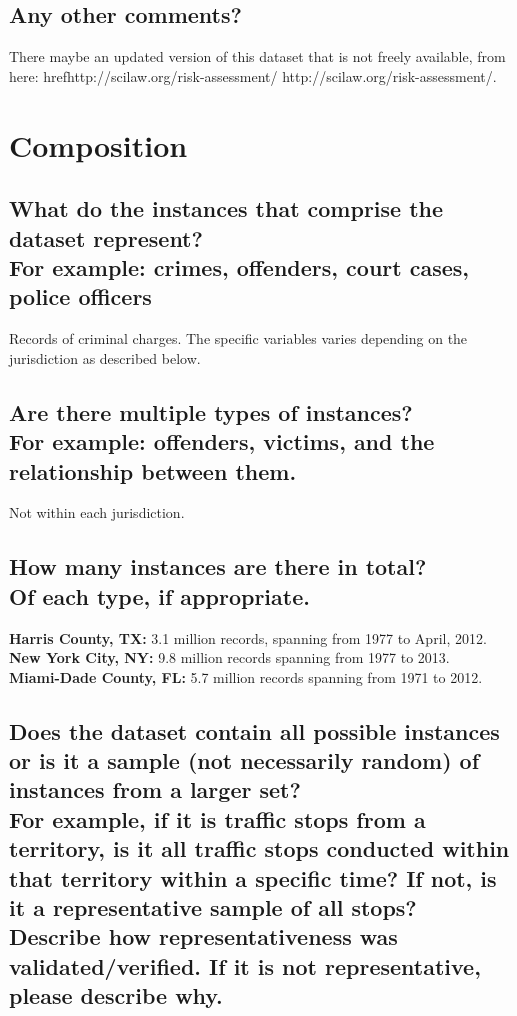 \documentclass[letterpaper, 10 pt, conference]{ieeeconf}  %
\newcommand{\subtitle}[1]{{\\ \small \normalfont \color{purple} #1}}
\begin{document}
\subsection{Any other comments?}

There maybe an updated version of this dataset that is not freely available, from here:
href{http://scilaw.org/risk-assessment/
}{http://scilaw.org/risk-assessment/}.

\section{Composition}

\subsection{What do the instances that comprise the dataset represent? \subtitle{For example: crimes, offenders, court cases, police officers}}

Records of criminal charges. The specific variables varies depending on the jurisdiction as described below.

\subsection{Are there multiple types of instances? \subtitle{For example: offenders, victims, and the relationship between them.}}

Not within each jurisdiction.

\subsection{How many instances are there in total? \subtitle{Of each type, if appropriate.}}

\textbf{Harris County, TX:} 3.1 million records, spanning from 1977 to April, 2012. \\
\textbf{New York City, NY:} 9.8 million records spanning from 1977 to 2013. \\

\textbf{Miami-Dade County, FL:} 5.7 million records spanning from 1971 to 2012.

\subsection{Does the dataset contain all possible instances or is it a sample (not necessarily random) of instances from a larger set? \subtitle{For example, if it is traffic stops from a territory, is it all traffic stops conducted within that territory within a specific time? If not, is it a representative sample of all stops? Describe how representativeness was validated/verified. If it is not representative, please describe why.}}
\end{document}
